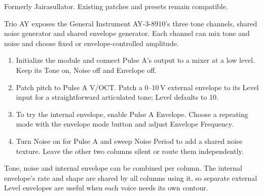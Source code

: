 Formerly Jairasullator. Existing patches and presets remain compatible.

Trio AY exposes the General Instrument AY-3-8910's three tone channels,
shared noise generator and shared envelope generator. Each channel can mix
tone and noise and choose fixed or envelope-controlled amplitude.

\begin{enumerate}
\item Initialize the module and connect Pulse A's output to a mixer at a
low level. Keep its Tone on, Noise off and Envelope off.
\item Patch pitch to Pulse A V/OCT. Patch a 0--10\,V external envelope to its
Level input for a straightforward articulated tone; Level defaults to 10.
\item To try the internal envelope, enable Pulse A Envelope. Choose a
repeating mode with the envelope mode button and adjust Envelope Frequency.
\item Turn Noise on for Pulse A and sweep Noise Period to add a shared noise
texture. Leave the other two columns silent or route them independently.
\end{enumerate}

Tone, noise and internal envelope can be combined per column. The internal
envelope's rate and shape are shared by all columns using it, so separate
external Level envelopes are useful when each voice needs its own contour.
